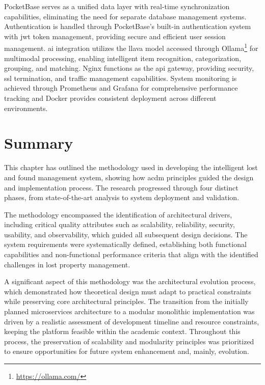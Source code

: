 PocketBase serves as a unified data layer with real-time synchronization capabilities, eliminating the need for separate database management systems. Authentication is handled through PocketBase's built-in authentication system with \ac{jwt} token management, providing secure and efficient user session management. \ac{ai} integration utilizes the \ac{llava} model accessed through Ollama\footnote{\url{https://ollama.com/}} for multimodal processing, enabling intelligent item recognition, categorization, grouping, and matching. Nginx functions as the \ac{api} gateway, providing security, \ac{ssl} termination, and traffic management capabilities. System monitoring is achieved through Prometheus and Grafana for comprehensive performance tracking and Docker provides consistent deployment across different environments.



\section{Summary} \label{section:methodology_summary}

This chapter has outlined the methodology used in developing the intelligent lost and found management system, showing how \ac{acdm} principles guided the design and implementation process. The research progressed through four distinct phases, from state-of-the-art analysis to system deployment and validation.

The methodology encompassed the identification of architectural drivers, including critical quality attributes such as scalability, reliability, security, usability, and observability, which guided all subsequent design decisions. The system requirements were systematically defined, establishing both functional capabilities and non-functional performance criteria that align with the identified challenges in lost property management.

A significant aspect of this methodology was the architectural evolution process, which demonstrated how theoretical design must adapt to practical constraints while preserving core architectural principles. The transition from the initially planned microservices architecture to a modular monolithic implementation was driven by a realistic assessment of development timeline and resource constraints, keeping the platform feasible within the academic context. Throughout this process, the preservation of scalability and modularity principles was prioritized to ensure opportunities for future system enhancement and, mainly, evolution.

